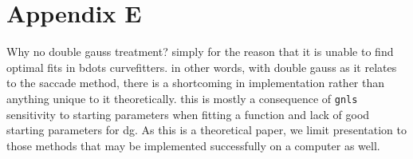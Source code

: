 \documentclass{article}
\newcommand{\xt}{\texttt}%
\begin{document}
\section*{Appendix E}

Why no double gauss treatment? simply for the reason that it is unable to find optimal fits in bdots curvefitters. in other words, with double gauss as it relates to the saccade method, there is a shortcoming in implementation rather than anything unique to it theoretically. this is mostly a consequence of \xt{gnls} sensitivity to starting parameters when fitting a function and lack of good starting parameters for dg. As this is a theoretical paper, we limit presentation to those methods that may be implemented successfully on a computer as well.
\end{document}

